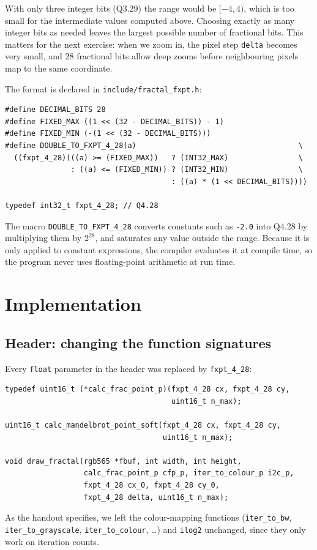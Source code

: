 \documentclass[11pt,a4paper]{article}
\begin{document}
With only three integer bits (Q3.29) the range would be $[-4, 4)$, which is
too small for the intermediate values computed above. Choosing exactly as many
integer bits as needed leaves the largest possible number of fractional bits.
This matters for the next exercise: when we zoom in, the pixel step
\texttt{delta} becomes very small, and 28 fractional bits allow deep zooms
before neighbouring pixels map to the same coordinate.

The format is declared in \texttt{include/fractal\_fxpt.h}:
\begin{lstlisting}
#define DECIMAL_BITS 28
#define FIXED_MAX ((1 << (32 - DECIMAL_BITS)) - 1)
#define FIXED_MIN (-(1 << (32 - DECIMAL_BITS)))
#define DOUBLE_TO_FXPT_4_28(a)                                     \
  ((fxpt_4_28)(((a) >= (FIXED_MAX))   ? (INT32_MAX)                \
               : ((a) <= (FIXED_MIN)) ? (INT32_MIN)                \
                                      : ((a) * (1 << DECIMAL_BITS))))

typedef int32_t fxpt_4_28; // Q4.28
\end{lstlisting}

The macro \texttt{DOUBLE\_TO\_FXPT\_4\_28} converts constants such as
\texttt{-2.0} into Q4.28 by multiplying them by $2^{28}$, and saturates any
value outside the range. Because it is only applied to constant expressions,
the compiler evaluates it at compile time, so the program never uses
floating-point arithmetic at run time.

\section{Implementation}

\subsection{Header: changing the function signatures}

Every \texttt{float} parameter in the header was replaced by
\texttt{fxpt\_4\_28}:
\begin{lstlisting}
typedef uint16_t (*calc_frac_point_p)(fxpt_4_28 cx, fxpt_4_28 cy,
                                      uint16_t n_max);

uint16_t calc_mandelbrot_point_soft(fxpt_4_28 cx, fxpt_4_28 cy,
                                    uint16_t n_max);

void draw_fractal(rgb565 *fbuf, int width, int height,
                  calc_frac_point_p cfp_p, iter_to_colour_p i2c_p,
                  fxpt_4_28 cx_0, fxpt_4_28 cy_0,
                  fxpt_4_28 delta, uint16_t n_max);
\end{lstlisting}
As the handout specifies, we left the colour-mapping functions
(\texttt{iter\_to\_bw}, \texttt{iter\_to\_grayscale},
\texttt{iter\_to\_colour}, \ldots) and \texttt{ilog2} unchanged, since they
only work on iteration counts.
\end{document}
